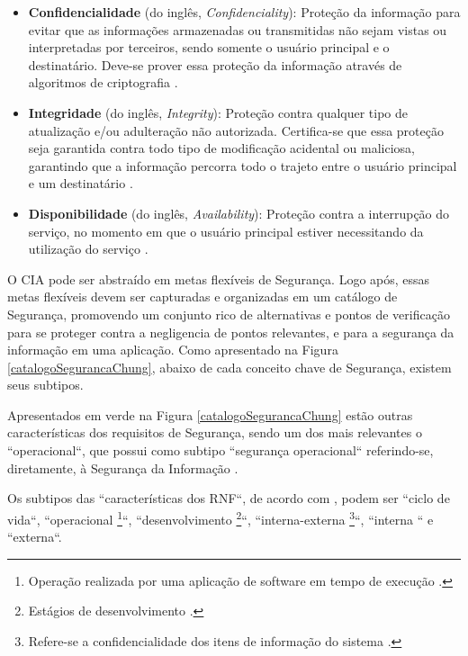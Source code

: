 \begin{itemize}
	\item \textbf{Confidencialidade} (do inglês, \textit{Confidenciality}): Proteção da informação para evitar que as informações armazenadas ou transmitidas não sejam vistas ou interpretadas por terceiros, sendo somente o usuário principal e o destinatário. Deve-se prover essa proteção da informação através de algoritmos de criptografia \cite{chung2012non} \cite{silva2007arquitetura}. 
	
	\item \textbf{Integridade} (do inglês, \textit{Integrity}): Proteção contra qualquer tipo de atualização e/ou adulteração não autorizada. Certifica-se que essa proteção seja garantida contra todo tipo de modificação acidental ou maliciosa, garantindo que a informação percorra todo o trajeto entre o usuário principal e um destinatário \cite{chung2012non} \cite{silva2007arquitetura}. 
	
	\item \textbf{Disponibilidade} (do inglês, \textit{Availability}): Proteção contra a interrupção do serviço, no momento em que o usuário principal estiver necessitando da utilização do serviço \cite{chung2012non} \cite{silva2007arquitetura}.
	  
\end{itemize}


O CIA pode ser abstraído em metas flexíveis de Segurança. Logo após, essas metas flexíveis devem ser capturadas e organizadas em um catálogo de Segurança, promovendo um conjunto rico de alternativas e pontos de verificação para se proteger contra a negligencia de pontos relevantes, e para a segurança da informação em uma aplicação. Como apresentado na Figura \ref{catalogoSegurancaChung},  abaixo de cada conceito chave de Segurança, existem seus subtipos. 

Apresentados em  verde na Figura \ref{catalogoSegurancaChung} estão outras características dos requisitos de Segurança, sendo um dos mais relevantes o ``operacional``, que possui como subtipo ``segurança operacional`` referindo-se, diretamente, à Segurança da Informação \cite{chung2012non}.

Os subtipos das ``características dos RNF``, de acordo com \cite{chung2012non}, podem ser ``ciclo de vida``, ``operacional \footnote[1]{Operação realizada por uma aplicação de software em tempo de execução \cite{chung2012non}.}``, ``desenvolvimento \footnote[2]{Estágios de desenvolvimento \cite{chung2012non}.}``, ``interna-externa \footnote[3]{Refere-se a confidencialidade dos itens de informação do sistema \cite{chung2012non}.}``, ``interna `` e ``externa``.


